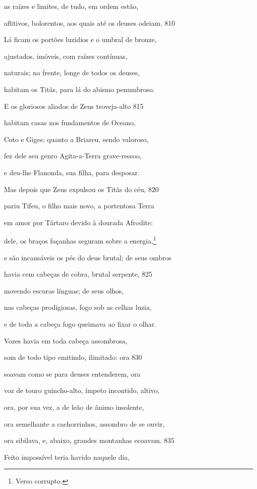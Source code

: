 as raízes e limites, de tudo, em ordem estão,

aflitivos, bolorentos, aos quais até os deuses odeiam. \num{810}

\quad{}Lá ficam os portões luzidios e o umbral de bronze,

ajustados, imóveis, com raízes contínuas,

naturais; na frente, longe de todos os deuses,

habitam os Titãs, para lá do abismo penumbroso.

E os gloriosos aliados de Zeus troveja-alto \num{815}

habitam casas nos fundamentos de Oceano,

Coto e Giges; quanto a Briareu, sendo valoroso,

fez dele seu genro Agita-a-Terra grave-ressoo,

e deu-lhe Flanonda, sua filha, para desposar.


Mas depois que Zeus expulsou os Titãs do céu, \num{820}

pariu Tifeu, o filho mais novo, a portentosa Terra

em amor por Tártaro devido à dourada Afrodite:

dele, os braços \dagger{}façanhas seguram sobre a energia\dagger{},\footnote{Verso corrupto.}

e são incansáveis os pés do deus brutal; de seus ombros

havia cem cabeças de cobra, brutal serpente, \num{825}

movendo escuras línguas; de seus olhos,

nas cabeças prodigiosas, fogo sob as celhas luzia,

e de toda a cabeça fogo queimava ao fixar o olhar.

Vozes havia em toda cabeça assombrosa,

som de todo tipo emitindo, ilimitado: ora \num{830}

soavam como se para deuses entenderem, ora

voz de touro guincho-alto, ímpeto incontido, altivo,

ora, por sua vez, a de leão de ânimo insolente,

ora semelhante a cachorrinhos, assombro de se ouvir,

ora sibilava, e, abaixo, grandes montanhas ecoavam. \num{835}

Feito impossível teria havido naquele dia,

